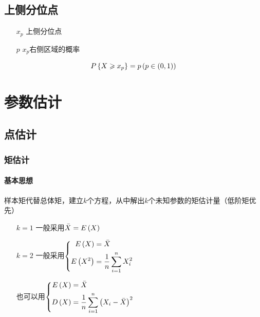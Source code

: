\documentclass{article}
\begin{document}
\subsection{上侧分位点}

\begin{enumerate}
    \item[$x_p$] 上侧分位点
    \item[$p$] $x_p$右侧区域的概率
\end{enumerate}

\[P\left\{X\geqslant x_p\right\}=p\left(p\in\left(0,1\right)\right)\]

\section{参数估计}

\subsection{点估计}


\subsubsection{矩估计}

\paragraph{基本思想}

样本矩代替总体矩，建立$k$个方程，从中解出$k$个未知参数的矩估计量（低阶矩优先）

\begin{enumerate}
    \item [$k=1$] 一般采用$\bar X=E\left(X\right)$
    \item [$k=2$]
          一般采用$\left\{\begin{aligned}
                  E\left(X\right)      & =\bar X              \\
                  E\left(X^2\right) & =\frac1n\sum\limits_{i=1}^n X_i^2 \\
              \end{aligned}\right.$

          也可以用$\left\{\begin{aligned}
                  E\left(X\right)    & =\bar X                          \\
                  D\left(X\right) & =\frac1n\sum\limits_{i=1}^n{\left(X_i-\bar X\right)}^2 \\
              \end{aligned}\right.$
\end{enumerate}
\end{document}
